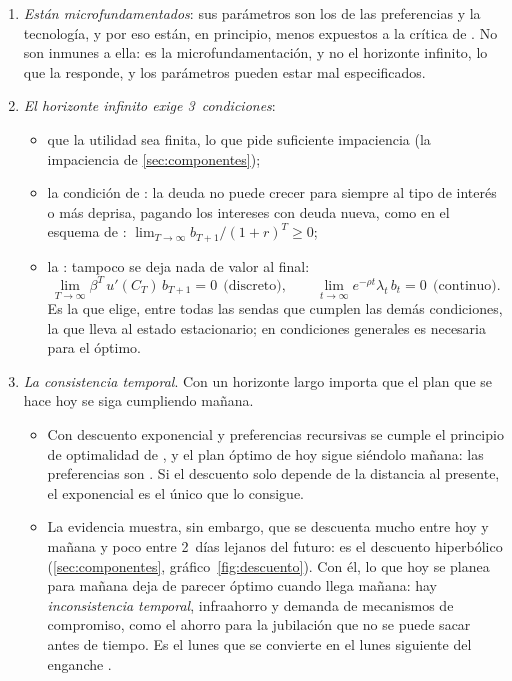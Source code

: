 \documentclass[11pt]{article}
\begin{document}
\begin{enumerate}
\item \emph{Están microfundamentados}: sus parámetros son los de las preferencias y la tecnología, y por eso están, en principio, menos expuestos a la crítica de . No son inmunes a ella: es la microfundamentación, y no el horizonte infinito, lo que la responde, y los parámetros pueden estar mal especificados.
\item \emph{El horizonte infinito exige 3~condiciones}:
  \begin{itemize}
  \item que la utilidad sea finita, lo que pide suficiente impaciencia (la impaciencia de \ref{sec:componentes});
  \item la condición de : la deuda no puede crecer para siempre al tipo de interés o más deprisa, pagando los intereses con deuda nueva, como en el esquema de : $\lim_{T\to\infty}b_{T+1}/(1+r)^T\geq0$;
  \item la : tampoco se deja nada de valor al final:
    \begin{equation*}
    \lim_{T\to\infty}\beta^T\,u'(C_T)\,b_{T+1}=0\ \ \text{(discreto)},\qquad\lim_{t\to\infty}e^{-\rho t}\lambda_t\,b_t=0\ \ \text{(continuo)}.
    \end{equation*}
    Es la que elige, entre todas las sendas que cumplen las demás condiciones, la que lleva al estado estacionario; en condiciones generales es necesaria para el óptimo\nocite{Michel1982Transversality}.
  \end{itemize}
\item \emph{La consistencia temporal}. Con un horizonte largo importa que el plan que se hace hoy se siga cumpliendo mañana.
  \begin{itemize}
  \item Con descuento exponencial y preferencias recursivas se cumple el principio de optimalidad de , y el plan óptimo de hoy sigue siéndolo mañana: las preferencias son . Si el descuento solo depende de la distancia al presente, el exponencial es el único que lo consigue\nocite{Strotz1955Myopia}.
  \item La evidencia muestra, sin embargo, que se descuenta mucho entre hoy y mañana y poco entre 2~días lejanos del futuro: es el descuento hiperbólico (\ref{sec:componentes}, gráfico~\ref{fig:descuento}). Con él, lo que hoy se planea para mañana deja de parecer óptimo cuando llega mañana: hay \emph{inconsistencia temporal}, infraahorro y demanda de mecanismos de compromiso, como el ahorro para la jubilación que no se puede sacar antes de tiempo. Es el lunes que se convierte en el lunes siguiente del enganche .

\end{itemize}
\end{enumerate}
\end{document}
